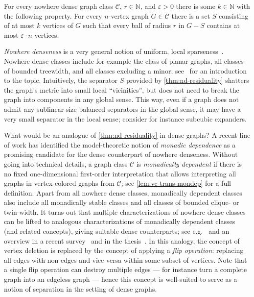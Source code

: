 \documentclass[a4paper,UKenglish,cleveref, autoref, thm-restate]{lipics-v2021}
\newcommand{\eps}{\varepsilon}
\newcommand{\N}[0]{\mathrm{\mathbb{N}}}
\newcommand{\CC}{\mathcal{C}}
\newcommand{\Cc}{\CC}
\begin{document}
\begin{theorem}\label{thm:nd-residuality}
    For every nowhere dense graph class $\CC$, $r\in\N$, and $\eps>0$ there is some $k\in\N$ with the following property.
    For every  $n$-vertex graph $G\in \CC$
  there is a set $S$ consisting of at most $k$ vertices of $G$
  such that every ball of radius $r$ in $G-S$ contains at most $\eps\cdot n$ vertices.
\end{theorem}

\emph{Nowhere denseness} is a very general notion of uniform, local sparseness~\cite{NesetrilM11a}.
Nowhere dense classes include for example the class of planar graphs, all classes of bounded treewidth, and all classes excluding a minor; see~\cite{sparsity-book} for an introduction to the topic. Intuitively, the separator $S$ provided by \cref{thm:nd-residuality} shatters the graph's metric into small local ``vicinities'', but does not need to break the graph into components in any global sense. This way, even if a graph does not admit any sublinear-size balanced separators in the global sense, it may have a very small separator in the local sense; consider for instance subcubic expanders.

What would be an analogue of \cref{thm:nd-residuality} in dense graphs? A recent line of work has identified the model-theoretic notion of {\em{monadic dependence}} as a promising candidate for the dense counterpart of nowhere denseness. Without going into technical details, a graph class $\Cc$ is {\em{monadically dependent}} if there is no fixed one-dimensional first-order interpretation that allows interpreting all graphs in vertex-colored graphs from $\Cc$; see \cref{lem:vc-trans-mondep} for a full definition.
Apart from all nowhere dense classes, monadically dependent classes also include all monadically stable classes and all classes of bounded clique- or twin-width.
It turns out that multiple characterizations of nowhere dense classes can be lifted to analogous characterizations of monadically dependent classes (and related concepts), giving suitable dense counterparts; see e.g.~\cite{flip-flatness,flip-breakability,flipper-game,flip-width} and an overview in a recent survey~\cite{Pilipczuk25} and in the thesis~\cite{maehlmann-thesis}. In this analogy, the concept of vertex deletion is replaced by the concept of applying a {\em{flip operation}}: replacing all edges with non-edges and vice versa within some subset of vertices. Note that a single flip operation can destroy multiple edges --- for instance turn a complete graph into an edgeless graph --- hence this concept is well-suited to serve as a notion of separation in the setting of dense graphs.
\end{document}
